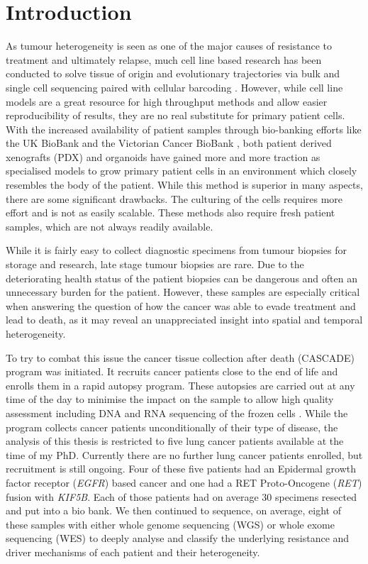 \section{Introduction}
\label{cascade-sec:intro}

As tumour heterogeneity is seen as one of the major causes of resistance to treatment and ultimately relapse, much cell line based research has been conducted to solve tissue of origin and evolutionary trajectories via bulk and single cell sequencing paired with cellular barcoding \cite{Fennell2021,Penter2022}. However, while cell line models are a great resource for high throughput methods and allow easier reproducibility of results, they are no real substitute for primary patient cells. With the increased availability of patient samples through bio-banking efforts  like the UK BioBank \cite{Sudlow2015} and the Victorian Cancer BioBank \cite{CCV2006}, both patient derived xenografts (PDX) and organoids have gained more and more traction \cite{Yoshida2020} as specialised models to grow primary patient cells in an environment which closely resembles the body of the patient. While this method is superior in many aspects, there are some significant drawbacks. The culturing of the cells requires more effort and is not as easily scalable. These methods also require fresh patient samples, which are not always readily available.

While it is fairly easy to collect diagnostic specimens from tumour biopsies for storage and research, late stage tumour biopsies are rare. Due to the deteriorating health status of the patient biopsies can be dangerous and often an unnecessary burden for the patient. However, these samples are especially critical when answering the question of how the cancer was able to evade treatment and lead to death, as it may reveal an unappreciated insight into spatial and temporal heterogeneity.

To try to combat this issue the cancer tissue collection after death (CASCADE) program was initiated. It recruits cancer patients close to the end of life and enrolls them in a rapid autopsy program. These autopsies are carried out at any time of the day to minimise the impact on the sample to allow high quality assessment including DNA and RNA sequencing of the frozen cells \cite{Alsop2016}.
While the program collects cancer patients unconditionally of their type of disease, the analysis of this thesis is restricted to five lung cancer patients available at the time of my PhD. Currently there are no further lung cancer patients enrolled, but recruitment is still ongoing. Four of these five patients had an Epidermal growth factor receptor (\textit{EGFR}) based cancer and one had a RET Proto-Oncogene (\textit{RET}) fusion with \textit{KIF5B}. Each of those patients had on average 30 specimens resected and put into a bio bank. We then continued to sequence, on average, eight of these samples with either whole genome sequencing (WGS) or whole exome sequencing (WES) to deeply analyse and classify the underlying resistance and driver mechanisms of each patient and their heterogeneity.

